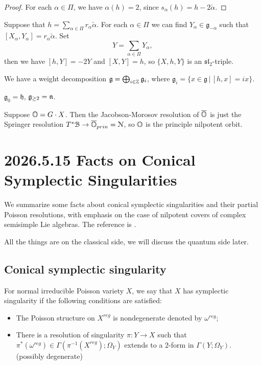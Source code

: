\documentclass[12pt]{amsart}
\numberwithin{equation}{section}
\newcommand{\CN}{{\mathcal {N}}} \newcommand{\CO}{{\mathcal {O}}} \newcommand{\CP}{{\mathcal {P}}}
\newcommand{\fg}{\mathfrak{g}} \newcommand{\fh}{\mathfrak{h}} \newcommand{\fk}{\mathfrak{k}}
\renewcommand{\bar}{\overline}
\newcommand{\set}[2]{\{#1\,|\,#2\}}
\begin{document}
\begin{proof}
  For each $\alpha \in \Pi$, we have $\alpha(h) = 2$, since $s_{\alpha}(h) = h - 2\check{\alpha}$.
\end{proof}


Suppose that $h = \sum_{\alpha \in \Pi} r_{\alpha} \check{\alpha}$. For each $\alpha \in \Pi$ we can find $Y_{\alpha} \in \fg_{-\alpha}$ such that $[X_{\alpha}, Y_{\alpha}] = r_{\alpha}\check{\alpha}$. Set 
\[
  Y = \sum_{\alpha \in \Pi} Y_{\alpha},
\] 
then we have $[h, Y] = -2Y$ and $[X, Y] = h$, so $\{X, h, Y\}$ is an $\mathfrak{sl}_2$-triple.

We have a weight decomposition $\fg = \bigoplus_{i \in \BZ} \fg_i$, where $\fg_i = \set{x \in \fg}{[h, x] = ix}$.

\begin{lem}
  $\fg_0 = \fh$, $\fg_{\geq 2} = \fn$.
\end{lem}

Suppose ${\mathbb {O}} = G\cdot X$. Then the Jacobson-Morosov resolution of $\bar{\BO}$ is just the Springer resolution $T^*\CB \to \bar{\BO}_{prin} = \CN$, so ${\mathbb {O}}$ is the principle nilpotent orbit.




\section{2026.5.15 Facts on Conical Symplectic Singularities}

We summarize some facts about conical symplectic singularities and their partial Poisson resolutions, with emphasis on the case of nilpotent covers of complex semisimple Lie algebras. The reference is \cite{Losev2022Topics}.

All the things are on the classical side, we will discuss the quantum side later.

\subsection{Conical symplectic singularity}

\begin{defn}
  For normal irreducible Poisson variety $X$, we say that $X$ has symplectic singularity if the following conditions are satisfied:
  \begin{itemize}
    \item The Poisson structure on $X^{reg}$ is nondegenerate denoted by $\omega^{reg}$;
    \item There is a resolution of singularity $\pi: Y \to X $ such that $\pi^{*}(\omega^{reg}) \in \Gamma(\pi^{-1}(X^{reg});\Omega_Y)$ extends to a 2-form in $\Gamma(Y;\Omega_Y)$. (possibly degenerate) 
  \end{itemize}
\end{defn}
\end{document}
